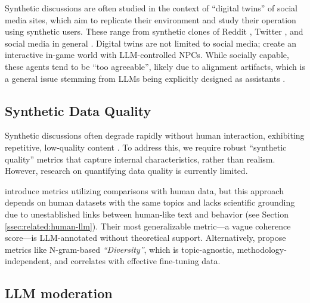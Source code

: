 Synthetic discussions are often studied in the context of “digital twins” of social media sites, which aim to replicate their environment and study their operation using synthetic users. These range from synthetic clones of Reddit \cite{park_simulacra}, Twitter \cite{mou_2024}, and social media in general \cite{tornberg_2023, y_social}. Digital twins are not limited to social media; \citet{Park2023GenerativeAI} create an interactive in-game world with \ac{LLM}-controlled \acp{NPC}. While socially capable, these agents tend to be “too agreeable”, likely due to alignment artifacts, which is a general issue stemming from \acp{LLM} being explicitly designed as assistants \cite{anthis_2025}. 

\subsection{Synthetic Data Quality}

Synthetic discussions often degrade rapidly without human interaction, exhibiting repetitive, low-quality content \citep{ulmer2024}. To address this, we require robust “synthetic quality” metrics that capture internal characteristics, rather than realism. However, research on quantifying data quality is currently limited.

\citet{balog_2024} introduce metrics utilizing comparisons with human data, but this approach depends on human datasets with the same topics and lacks scientific grounding due to unestablished links between human-like text and behavior (see Section \ref{ssec:related:human-llm}). Their most generalizable metric—a vague coherence score—is \ac{LLM}-annotated without theoretical support. Alternatively, \citet{ulmer2024} propose metrics like N-gram-based \textit{“Diversity”}, which is topic-agnostic, methodology-independent, and correlates with effective fine-tuning data.


\subsection{LLM moderation}

